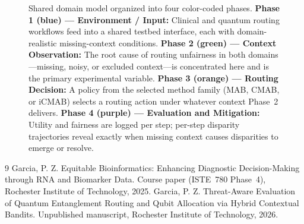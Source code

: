 \documentclass{IEEEtran}
\begin{document}
\begin{figure}[!t]
{%
}
\caption{%
  Shared domain model organized into four color-coded phases.
  \textcolor{phase1blue}{\textbf{Phase 1 (blue) --- Environment / Input:}}
    Clinical and quantum routing workflows feed into a shared testbed interface,
    each with domain-realistic missing-context conditions.
  \textcolor{phase2green}{\textbf{Phase 2 (green) --- Context Observation:}}
    The root cause of routing unfairness in both domains---missing, noisy, or
    excluded context---is concentrated here and is the primary experimental variable.
  \textcolor{phase3orange}{\textbf{Phase 3 (orange) --- Routing Decision:}}
    A policy from the selected method family (MAB, CMAB, or iCMAB) selects a
    routing action under whatever context Phase~2 delivers.
  \textcolor{phase4purple}{\textbf{Phase 4 (purple) --- Evaluation and Mitigation:}}
    Utility and fairness are logged per step; per-step disparity trajectories
    reveal exactly when missing context causes disparities to emerge or resolve.}
\label{fig:domain_model}
\end{figure}



\begin{thebibliography}{9}\setlength{\itemsep}{0em}
Garcia, P. Z. Equitable Bioinformatics: Enhancing Diagnostic
Decision-Making through {RNA} and Biomarker Data. Course paper
(ISTE~780 Phase~4), Rochester Institute of Technology, 2025.
Garcia, P. Z. Threat-Aware Evaluation of Quantum Entanglement Routing
and Qubit Allocation via Hybrid Contextual Bandits. Unpublished
manuscript, Rochester Institute of Technology, 2026.
\end{thebibliography}
\end{document}
